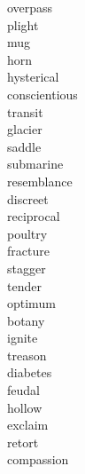 \documentclass[b5paper, 11pt]{ctexart}
\begin{document}
\begin{multicols*}{3}
\begin{description}
\item[overpass]

\item[plight]

\item[mug]

\item[horn]

\item[hysterical]

\item[conscientious]

\item[transit]

\item[glacier]

\item[saddle]

\item[submarine]

\item[resemblance]

\item[discreet]

\item[reciprocal]

\item[poultry]

\item[fracture]

\item[stagger]

\item[tender]

\item[optimum]

\item[botany]

\item[ignite]

\item[treason]

\item[diabetes]

\item[feudal]

\item[hollow]

\item[exclaim]

\item[retort]

\item[compassion]


\end{description}
\end{multicols*}
\end{document}
